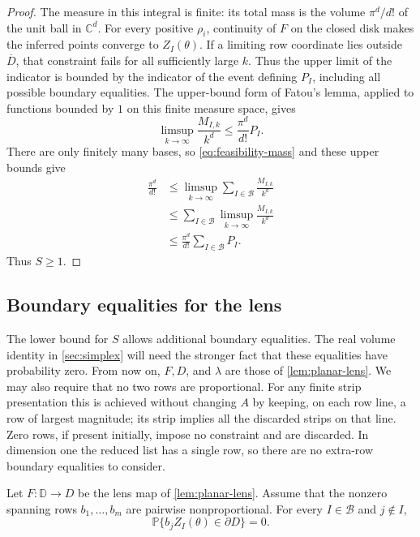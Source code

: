 \begin{proof}
The measure in this integral is finite: its total mass is the volume $\pi^d/d!$ of the unit ball in $\mathbb{C}^d$. For every positive $\rho_i$, continuity of $F$ on the closed disk makes the inferred points converge to $Z_I(\theta)$. If a limiting row coordinate lies outside $\overline D$, that constraint fails for all sufficiently large $k$. Thus the upper limit of the indicator is bounded by the indicator of the event defining $P_I$, including all possible boundary equalities. The upper-bound form of Fatou's lemma, applied to functions bounded by $1$ on this finite measure space, gives
\[
 \limsup_{k\to\infty}\frac{M_{I,k}}{k^d}
 \leq \frac{\pi^d}{d!}P_I.
\]
There are only finitely many bases, so \eqref{eq:feasibility-mass} and these upper bounds give
\begin{align*}
 \frac{\pi^d}{d!}
 &\leq\limsup_{k\to\infty}
          \sum_{I\in\mathcal{B}}\frac{M_{I,k}}{k^d}\\
 &\leq\sum_{I\in\mathcal{B}}
          \limsup_{k\to\infty}\frac{M_{I,k}}{k^d}\\
 &\leq\frac{\pi^d}{d!}\sum_{I\in\mathcal{B}}P_I.
\end{align*}
Thus $S\geq1$.
\end{proof}

\subsection{Boundary equalities for the lens}

The lower bound for $S$ allows additional boundary equalities. The real volume identity in \cref{sec:simplex} will need the stronger fact that these equalities have probability zero. From now on, $F,D$, and $\lambda$ are those of \cref{lem:planar-lens}. We may also require that no two rows are proportional. For any finite strip presentation this is achieved without changing $A$ by keeping, on each row line, a row of largest magnitude; its strip implies all the discarded strips on that line. Zero rows, if present initially, impose no constraint and are discarded. In dimension one the reduced list has a single row, so there are no extra-row boundary equalities to consider.

\begin{lemma}
\label{lem:boundary-ties}
Let $F:\mathbb{D}\to D$ be the lens map of \cref{lem:planar-lens}. Assume that the nonzero spanning rows $b_1,\ldots,b_m$ are pairwise nonproportional. For every $I\in\mathcal{B}$ and $j\notin I$,
\[
 \mathbb{P}\{b_jZ_I(\theta)\in\partial D\}=0.
\]
\end{lemma}

